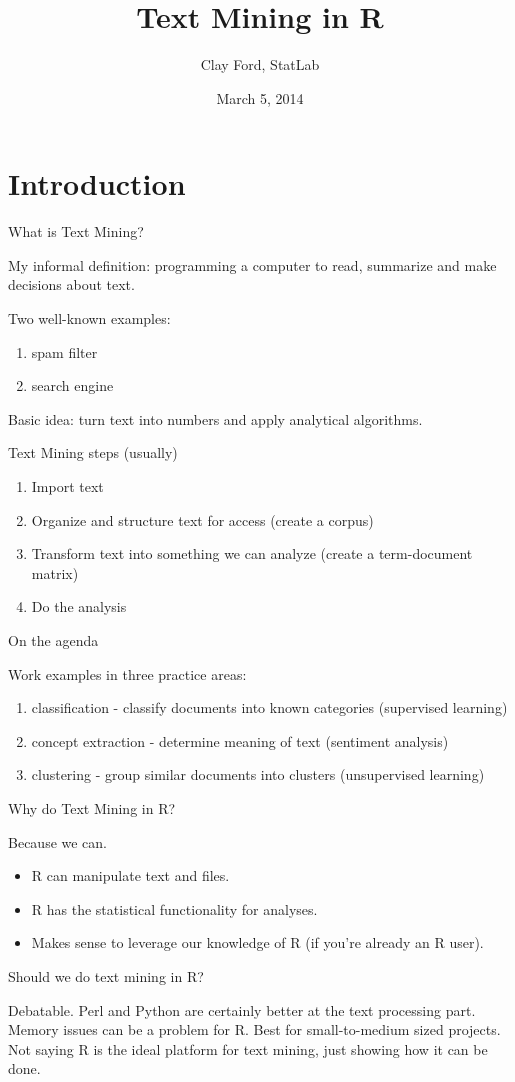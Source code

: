 \documentclass[xcolor=dvipsnames]{beamer}
\newcommand{\be}{\begin{enumerate}}
\newcommand{\ee}{\end{enumerate}}
\newcommand{\bi}{\begin{itemize}}
\newcommand{\ei}{\end{itemize}}
\newcommand{\+}{\item}
\begin{document}
\title[Text Mining in R \hspace{25mm} \insertframenumber/\inserttotalframenumber]{Text Mining in R}
\author{Clay Ford, StatLab}
\date{March 5, 2014}

\frame{\titlepage} 
\section{Introduction}
\begin{frame}{What is Text Mining?}

My informal definition: programming a computer to read, summarize and make decisions about text. 

Two well-known examples:
\be
	\+ spam filter
	\+ search engine
\ee

Basic idea: turn text into numbers and apply analytical algorithms. 
\end{frame}

\begin{frame}{Text Mining steps (usually)}

\be
	\+ Import text
	\+ Organize and structure text for access (create a corpus)
	\+ Transform text into something we can analyze (create a term-document matrix)
	\+ Do the analysis
\ee

\end{frame}

\begin{frame}{On the agenda}

Work examples in three practice areas:
\be
	\+ classification - classify documents into known categories (supervised learning)
	\+ concept extraction - determine meaning of text (sentiment analysis)
	\+ clustering - group similar documents into clusters (unsupervised learning)
\ee

\end{frame}

\begin{frame}{Why do Text Mining in R?}

Because we can. 

\bi
	\+ R can manipulate text and files. 
	\+ R has the statistical functionality for analyses. 
	\+ Makes sense to leverage our knowledge of R (if you're already an R user).
\ei

\pause

Should we do text mining in R? 


Debatable. Perl and Python are certainly better at the text processing part. Memory issues can be a problem for R. Best for small-to-medium sized projects. \\[\baselineskip]

Not saying R is the ideal platform for text mining, just showing how it can be done.


\end{frame}
\end{document}

